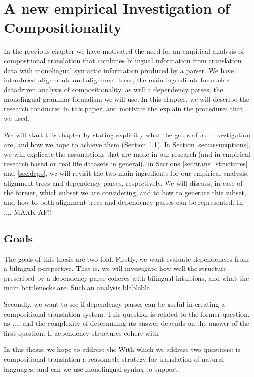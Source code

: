 \documentclass{report}
\begin{document}
\chapter{A new empirical Investigation of Compositionality}

In the previous chapter we have motivated the need for an empirical analysis of compositional translation that combines bilingual information from translation data with monolingual syntactic information produced by a parser. We have introduced alignments and alignment trees, the main ingredients for such a datadriven analysis of compositionality, as well a dependency parses, the monolingual grammar formalism we will use. In this chapter, we will describe the research conducted in this paper, and motivate the explain the procedures that we used. 

We will start this chapter by stating explicitly what the goals of our investigation are, and how we hope to achieve them (Section \ref{sec:goals}). In Section \ref{sec:assumptions}, we will explicate the assumptions that are made in our research (and in empirical research based on real life datasets in general). In Sections \ref{sec:trans_structures} and \ref{sec:deps}, we will revisit the two main ingredients for our empirical analysis, alignment trees and dependency parses, respectively. We will discuss, in case of the former, which subset we are considering, and to how to generate this subset, and how to both alignment trees and dependency parses can be represented. In .... MAAK AF!!




\section{Goals}
\label{sec:goals}

The goals of this thesis are two fold. Firstly, we want evaluate dependencies from a bilingual perspective. That is, we will investigate how well the structure prescribed by a dependency parse coheres with bilingual intuitions, and what the main bottlenecks are. Such an analysis blablabla

Secondly, we want to see if dependency parses can be useful in creating a compositional translation system. This question is related to the former question, as .... and the complexity of determining its answer depends on the answer of the first question. If dependency structures cohere with 

In this thesis, we hope to address the 
With which we address two questions: is compositional translation a reasonable strategy for translation of natural languages, and can we use monolingual syntax to support 
\end{document}
